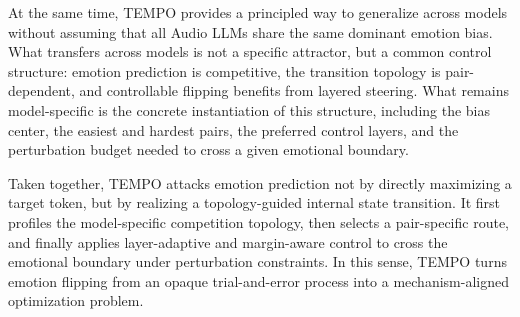 At the same time, \textsc{TEMPO} provides a principled way to generalize across models without assuming that all Audio LLMs share the same dominant emotion bias. What transfers across models is not a specific attractor, but a common control structure: emotion prediction is competitive, the transition topology is pair-dependent, and controllable flipping benefits from layered steering. What remains model-specific is the concrete instantiation of this structure, including the bias center, the easiest and hardest pairs, the preferred control layers, and the perturbation budget needed to cross a given emotional boundary.

Taken together, \textsc{TEMPO} attacks emotion prediction not by directly maximizing a target token, but by realizing a topology-guided internal state transition. It first profiles the model-specific competition topology, then selects a pair-specific route, and finally applies layer-adaptive and margin-aware control to cross the emotional boundary under perturbation constraints. In this sense, \textsc{TEMPO} turns emotion flipping from an opaque trial-and-error process into a mechanism-aligned optimization problem.
